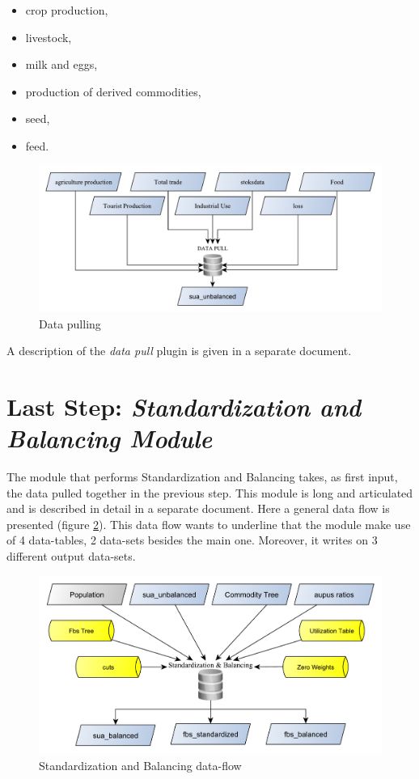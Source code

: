 \documentclass[]{article}
\providecommand{\tightlist}{%
  \setlength{\itemsep}{0pt}\setlength{\parskip}{0pt}}
\begin{document}
\begin{itemize}
\tightlist
\item
  crop production,
\item
  livestock,
\item
  milk and eggs,
\item
  production of derived commodities,
\item
  seed,
\item
  feed.
\end{itemize}

\begin{figure}[H]

{\centering \includegraphics[width=0.9\linewidth]{images/SwsFbs/17_pulldata} 

}

\caption{\label{fig:f17}Data pulling}\label{fig:f17}
\end{figure}

A description of the \emph{data pull} plugin is given in a separate
document.

\section{\texorpdfstring{Last Step: \emph{Standardization and Balancing
Module}}{Last Step: Standardization and Balancing Module}}\label{last-step-standardization-and-balancing-module}

The module that performs Standardization and Balancing takes, as first
input, the data pulled together in the previous step. This module is
long and articulated and is described in detail in a separate document.
Here a general data flow is presented (figure \ref{fig:f18}). This data
flow wants to underline that the module make use of 4 data-tables, 2
data-sets besides the main one. Moreover, it writes on 3 different
output data-sets.

\begin{figure}[H]

{\centering \includegraphics[width=0.8\linewidth]{images/SwsFbs/18_standBAl} 

}

\caption{\label{fig:f18}Standardization and Balancing data-flow}\label{fig:f18}
\end{figure}
\end{document}
